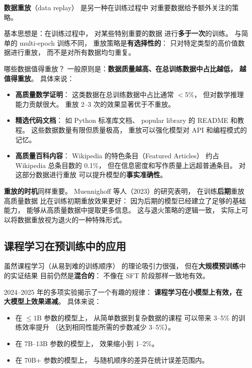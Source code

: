 \textbf{数据重放}（data replay）
是另一种在训练过程中
对重要数据给予额外关注的策略。

基本思想是：在训练过程中，
对某些特别重要的数据
进行\textbf{多于一次}的训练。
与简单的 multi-epoch 训练不同，
重放策略是\textbf{有选择性的}：
只对特定类型的高价值数据进行重放，
而不是对所有数据均匀重复。

哪些数据值得重放？
一般原则是：\textbf{数据质量越高、在总训练数据中占比越低，
越值得重放}。
具体来说：

\begin{itemize}[noitemsep]
  \item \textbf{高质量数学证明}：
        这类数据在总训练数据中占比通常 $<$5\%，
        但对数学推理能力贡献很大。
        重放 2--3 次的效果显著优于不重放。
  \item \textbf{精选代码文档}：
        如 Python 标准库文档、
        popular library 的 README 和教程。
        这些数据数量有限但质量极高，
        重放可以强化模型对 API 和编程模式的记忆。
  \item \textbf{高质量百科内容}：
        Wikipedia 的特色条目（Featured Articles）
        约占 Wikipedia 总条目数的 0.1\%，
        但在信息密度和写作质量上远超普通条目。
        对这部分数据进行重放
        可以提升模型的\textbf{事实准确性}。
\end{itemize}

\textbf{重放的时机}同样重要。
Muennighoff 等人（2023）的研究表明，
在训练\textbf{后期}重放高质量数据
比在训练初期重放效果更好：
因为后期的模型已经建立了足够的基础能力，
能够从高质量数据中提取更多信息。
这与退火策略的逻辑一致，
实际上可以将数据重放视为退火的一种特殊形式。

\subsection{课程学习在预训练中的应用}

虽然课程学习（从易到难的训练顺序）
的理论吸引力很强，
但在\textbf{大规模预训练}中的实证结果
目前仍然是\textbf{混合的}：
不像在 SFT 阶段那样一致地有效。

2024--2025 年的多项实验揭示了一个有趣的规律：
\textbf{课程学习在小模型上有效，在大模型上效果递减}。
具体来说：
\begin{itemize}[noitemsep]
  \item 在 $\leq$1B 参数的模型上，
        从简单数据到复杂数据的课程
        可以带来 3--5\% 的训练效率提升
        （达到相同性能所需的步数减少 3--5\%）。
  \item 在 7B--13B 参数的模型上，
        效果缩小到 1--2\%。
  \item 在 70B+ 参数的模型上，
        与随机顺序的差异在统计误差范围内。
\end{itemize}


